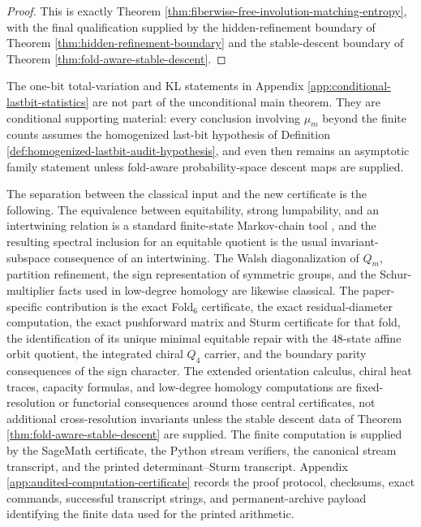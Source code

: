 \documentclass[12pt,a4paper]{article}
\theoremstyle{plain}
\theoremstyle{definition}
\numberwithin{equation}{section}
\begin{document}
\begin{proof}
This is exactly Theorem \ref{thm:fiberwise-free-involution-matching-entropy}, with the final qualification supplied by the hidden-refinement boundary of Theorem \ref{thm:hidden-refinement-boundary} and the stable-descent boundary of Theorem \ref{thm:fold-aware-stable-descent}. \qedhere
\end{proof}

The one-bit total-variation and KL statements in Appendix \ref{app:conditional-lastbit-statistics} are not part of the unconditional main theorem.  They are conditional supporting material: every conclusion involving \(\mu_m\) beyond the finite counts assumes the homogenized last-bit hypothesis of Definition \ref{def:homogenized-lastbit-audit-hypothesis}, and even then remains an asymptotic family statement unless fold-aware probability-space descent maps are supplied.

The separation between the classical input and the new certificate is the following.  The equivalence between equitability, strong lumpability, and an intertwining relation is a standard finite-state Markov-chain tool \cite{burke1958markovian,kemeny1976finite,buchholz1994exact}, and the resulting spectral inclusion for an equitable quotient is the usual invariant-subspace consequence of an intertwining.  The Walsh diagonalization of \(Q_m\), partition refinement, the sign representation of symmetric groups, and the Schur-multiplier facts used in low-degree homology are likewise classical.  The paper-specific contribution is the exact Fold\(_6\) certificate, the exact residual-diameter computation, the exact pushforward matrix and Sturm certificate for that fold, the identification of its unique minimal equitable repair with the \(48\)-state affine orbit quotient, the integrated chiral \(Q_4\) carrier, and the boundary parity consequences of the sign character.  The extended orientation calculus, chiral heat traces, capacity formulas, and low-degree homology computations are fixed-resolution or functorial consequences around those central certificates, not additional cross-resolution invariants unless the stable descent data of Theorem \ref{thm:fold-aware-stable-descent} are supplied.  The finite computation is supplied by the SageMath certificate, the Python stream verifiers, the canonical stream transcript, and the printed determinant--Sturm transcript.  Appendix \ref{app:audited-computation-certificate} records the proof protocol, checksums, exact commands, successful transcript strings, and permanent-archive payload identifying the finite data used for the printed arithmetic.
\end{document}
